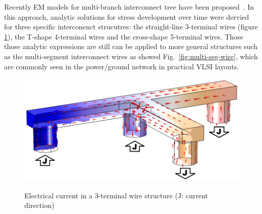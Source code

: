 Recently EM models for multi-branch interconnect tree have been
proposed~\cite{ChenHuang:DAC'15,ChenTan:TCAD'16}. In this approach,
analytic solutions for stress development over time were dervied for
three specific interconenct strucutres: the straight-line 3-terminal
wires (figure \ref{fig:tshape-demo}), the T-shape 4-terminal wires and the cross-shape 5-terminal
wires. Those those analytic expressions are still can be applied to
more general structures such as the multi-segment interconnect wires
as showed Fig.~\ref{fig:multi-seg-wire}, which are commonly seen in
the power/ground network in practical VLSI layouts.

\begin{figure}[!th]
\centering
\includegraphics[width=0.72\columnwidth]{tshape_demo.eps}
\label{fig:tshape-demo}
\caption{Electrical current in a 3-terminal wire structure (J: current direction)}
\end{figure}



